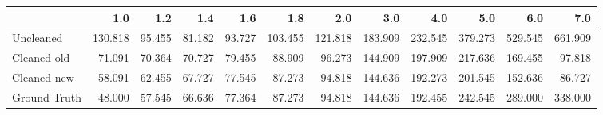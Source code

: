 \begin{tabular}{lrrrrrrrrrrr}
\toprule
{} &     1.0 &    1.2 &    1.4 &    1.6 &     1.8 &     2.0 &     3.0 &     4.0 &     5.0 &     6.0 &     7.0 \\
\midrule
Uncleaned    & 130.818 & 95.455 & 81.182 & 93.727 & 103.455 & 121.818 & 183.909 & 232.545 & 379.273 & 529.545 & 661.909 \\
Cleaned old  &  71.091 & 70.364 & 70.727 & 79.455 &  88.909 &  96.273 & 144.909 & 197.909 & 217.636 & 169.455 &  97.818 \\
Cleaned new  &  58.091 & 62.455 & 67.727 & 77.545 &  87.273 &  94.818 & 144.636 & 192.273 & 201.545 & 152.636 &  86.727 \\
Ground Truth &  48.000 & 57.545 & 66.636 & 77.364 &  87.273 &  94.818 & 144.636 & 192.455 & 242.545 & 289.000 & 338.000 \\
\bottomrule
\end{tabular}
